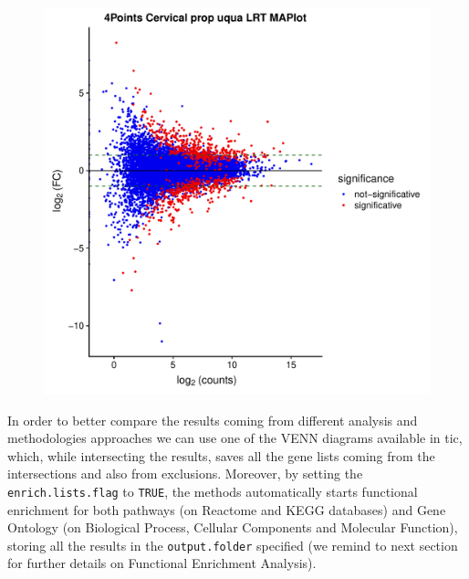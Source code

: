 \begin{figure}[H]
\includegraphics[width=\textwidth,height=\textheight,keepaspectratio]{img/ticorser/de/volcma.pdf}
\caption[ticorser Volcano-MA plots]{}
\label{fig:ticorservolcma}
\centering
\end{figure}

In order to better compare the results coming from different analysis and methodologies approaches we can use one of the VENN diagrams available in \gls{tic}, which, while intersecting the results, saves all the gene lists coming from the intersections and also from exclusions.
Moreover, by setting the \lstinline!enrich.lists.flag! to \lstinline!TRUE!, the methods automatically starts functional enrichment for both pathways (on Reactome and KEGG databases) and Gene Ontology (on Biological Process, Cellular Components and Molecular Function), storing all the results in the \lstinline!output.folder! specified (we remind to next section for further details on Functional Enrichment Analysis).

